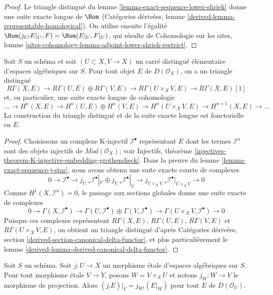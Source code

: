 \begin{proof}
Le triangle distingu\'e du lemme
\ref{lemma-exact-sequence-lower-shriek} donne une suite exacte longue de
$\Hom$ (Cat\'egories d\'eriv\'ees, lemme
\ref{derived-lemma-representable-homological}). On utilise ensuite l'\'egalit\'e
$\Hom(j_{U!}E|_U, F) = \Hom(E|_U, F|_U)$, qui r\'esulte de Cohomologie sur les
sites, lemme
\ref{sites-cohomology-lemma-adjoint-lower-shriek-restrict}.
\end{proof}

\begin{lemma}
\label{lemma-unbounded-mayer-vietoris}
Soit $S$ un sch\'ema et soit $(U \subset X, V \to X)$ un carr\'e distingu\'e
\'el\'ementaire d'espaces alg\'ebriques sur $S$. Pour tout objet $E$ de
$D(\mathcal{O}_X)$, on a un triangle distingu\'e
$$
R\Gamma(X, E) \to R\Gamma(U, E) \oplus R\Gamma(V, E) \to
R\Gamma(U \times_X V, E) \to R\Gamma(X, E)[1]
$$
et, en particulier, une suite exacte longue de cohomologie
$$
\ldots \to
H^n(X, E) \to
H^n(U, E) \oplus H^n(V, E) \to
H^n(U \times_X V, E) \to
H^{n + 1}(X, E) \to \ldots
$$
La construction du triangle distingu\'e et de la suite exacte longue est
fonctorielle en $E$.
\end{lemma}

\begin{proof}
Choisissons un complexe K-injectif $\mathcal{I}^\bullet$ repr\'esentant $E$
dont les termes $\mathcal{I}^n$ sont des objets injectifs de
$\textit{Mod}(\mathcal{O}_X)$; voir Injectifs, th\'eor\`eme
\ref{injectives-theorem-K-injective-embedding-grothendieck}.
Dans la preuve du lemme \ref{lemma-exact-sequence-j-star}, nous avons obtenu
une suite exacte courte de complexes
$$
0 \to \mathcal{I}^\bullet \to
j_{U, *}\mathcal{I}^\bullet|_U \oplus j_{V, *}\mathcal{I}^\bullet|_V \to
j_{U \times_X V, *}\mathcal{I}^\bullet|_{U \times_X V} \to 0
$$
Comme $H^1(X, \mathcal{I}^n) = 0$, le passage aux sections globales donne
une suite exacte de complexes
$$
0 \to \Gamma(X, \mathcal{I}^\bullet) \to
\Gamma(U, \mathcal{I}^\bullet) \oplus
\Gamma(V, \mathcal{I}^\bullet) \to
\Gamma(U \times_X V, \mathcal{I}^\bullet) \to 0
$$
Puisque ces complexes repr\'esentent $R\Gamma(X, E)$, $R\Gamma(U, E)$,
$R\Gamma(V, E)$ et $R\Gamma(U \times_X V, E)$, on obtient un triangle
distingu\'e d'apr\`es Cat\'egories d\'eriv\'ees, section
\ref{derived-section-canonical-delta-functor}, et plus particuli\`erement le
lemme \ref{derived-lemma-derived-canonical-delta-functor}.
\end{proof}

\begin{lemma}
\label{lemma-restrict-lower-shriek}
Soit $S$ un sch\'ema. Soit $j : U \to X$ un morphisme \'etale d'espaces
alg\'ebriques sur $S$. Pour tout morphisme \'etale $V \to Y$, posons
$W = V \times_X U$ et notons $j_W : W \to V$ le morphisme de projection.
Alors $(j_!E)|_V = j_{W!}(E|_W)$ pour tout $E$ de $D(\mathcal{O}_U)$.
\end{lemma}


